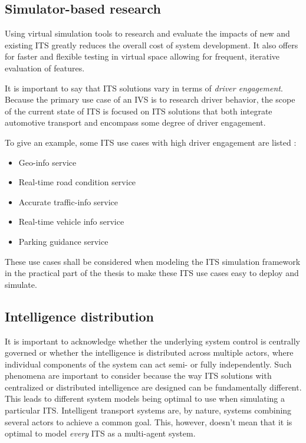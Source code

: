 \documentclass[0main.tex]{subfiles}
\begin{document}
\subsection{Simulator-based research}

Using virtual simulation tools to research and evaluate the impacts of new and existing ITS 
greatly reduces the overall cost of system development. It also offers for faster 
and flexible testing in virtual space allowing for frequent, iterative evaluation of features.

It is important to say that ITS solutions vary in terms of \emph{driver engagement}. Because
the primary use case of an IVS is to research driver behavior, the scope of the current state
of ITS is focused on ITS solutions that both integrate automotive transport and encompass some
degree of driver engagement. 

To give an example, some ITS use cases with high driver engagement are listed \cite{Lishchenko2021}:

\begin{itemize}
    \item Geo-info service
    \item Real-time road condition service 
    \item Accurate traffic-info service 
    \item Real-time vehicle info service 
    \item Parking guidance service
\end{itemize}

These use cases shall be considered when modeling the ITS simulation framework in the practical part of the 
thesis to make these ITS use cases easy to deploy and simulate.

\subsection{Intelligence distribution} \label{mas-compatibility}

It is important to acknowledge whether the underlying system control is centrally governed 
or whether the intelligence is distributed across multiple actors, where individual 
components of the system can act semi- or fully independently.
Such phenomena are important to consider because the way ITS solutions 
with centralized or distributed intelligence are designed can be fundamentally different.
This leads to different system models being optimal to use when simulating a particular ITS. 
Intelligent transport systems are, by nature, systems combining several actors to
achieve a common goal. This, however, doesn't mean that it is optimal to model \emph{every} ITS 
as a multi-agent system. 
\end{document}
